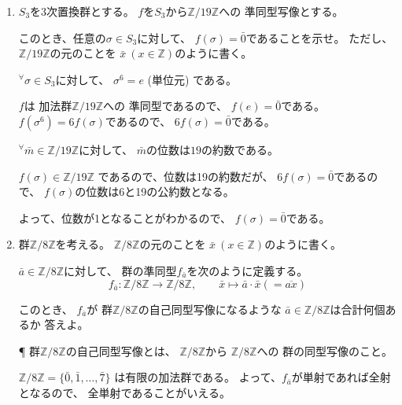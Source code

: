 \documentclass[12pt,b5paper]{ltjsarticle}
\begin{document}
\hrulefill
\begin{enumerate}
 \item
      $S_3$を$3$次置換群とする。
      $f$を$S_3$から$\mathbb{Z}/19\mathbb{Z}$への
      準同型写像とする。
      
      このとき、任意の$\sigma\in S_3$に対して、
      $f(\sigma)=\bar{0}$であることを示せ。
      ただし、
      $\mathbb{Z}/19\mathbb{Z}$の元のことを
      $\bar{x}\ (x\in\mathbb{Z})$のように書く。

      \dotfill

      ${}^{\forall}\sigma\in S_{3}$に対して、
      $\sigma^{6}=e$ (単位元) である。

      $f$は
      加法群$\mathbb{Z}/19\mathbb{Z}$への
      準同型であるので、
      $f(e)=\bar{0}$である。
      $f(\sigma^6)=6f(\sigma)$であるので、
      $6f(\sigma)=\bar{0}$である。

      ${}^{\forall}\bar{m}\in\mathbb{Z}/19\mathbb{Z}$に対して、
      $\bar{m}$の位数は$19$の約数である。

      $f(\sigma)\in\mathbb{Z}/19\mathbb{Z}$
      であるので、位数は19の約数だが、
      $6f(\sigma)=\bar{0}$であるので、
      $f(\sigma)$の位数は6と19の公約数となる。

      よって、位数が1となることがわかるので、
      $f(\sigma)=\bar{0}$である。

      \hrulefill
 \item
      群$\mathbb{Z}/8\mathbb{Z}$を考える。
      $\mathbb{Z}/8\mathbb{Z}$の元のことを
      $\bar{x}\ (x\in\mathbb{Z})$のように書く。

      $\bar{a}\in\mathbb{Z}/8\mathbb{Z}$に対して、
      群の準同型$f_{\bar{a}}$を次のように定義する。
      \begin{equation}
       f_{\bar{a}} : \mathbb{Z}/8\mathbb{Z} \to \mathbb{Z}/8\mathbb{Z}
        ,\qquad
        \bar{x} \mapsto \bar{a}\cdot \bar{x} (=\overline{ax})
      \end{equation}

      このとき、
      $f_{\bar{a}}$が
      群$\mathbb{Z}/8\mathbb{Z}$の自己同型写像になるような
      $\bar{a}\in\mathbb{Z}/8\mathbb{Z}$は合計何個あるか
      答えよ。

      \P
      群$\mathbb{Z}/8\mathbb{Z}$の自己同型写像とは、
      $\mathbb{Z}/8\mathbb{Z}$から
      $\mathbb{Z}/8\mathbb{Z}$への
      群の同型写像のこと。

      \dotfill

      $\mathbb{Z}/8\mathbb{Z}=\{\bar{0},\bar{1},\dots,\bar{7}\}$
      は有限の加法群である。
      よって、$f_{\bar{a}}$が単射であれば全射となるので、
      全単射であることがいえる。


\end{enumerate}
\end{document}

